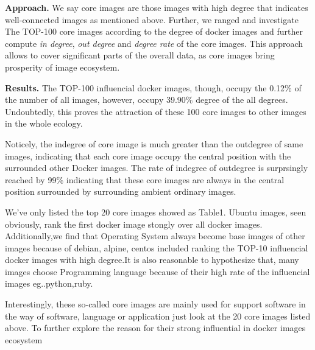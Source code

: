 \documentclass[sigconf]{acmart}
\begin{document}
\noindent\textbf{Approach. }We say core images are those images with high degree that indicates well-connected images as mentioned above. Further, we ranged and investigate The TOP-100 core images according to the degree of docker images and further compute \emph{in degree}, \emph{out degree} and \emph{degree rate} of the core images. This approach allows to cover significant parts of the overall data, as core images bring prosperity of image ecosystem.  %

\noindent\textbf{Results. }
The TOP-100 influencial docker images, though, occupy the 0.12\% of the number of all images, however, occupy 39.90\% degree of the all degrees. Undoubtedly, this proves the attraction of these 100 core images to other images in the whole ecology. 

Noticely, the indegree of core image is much greater than the outdegree of same images, indicating that each core image occupy the central position with the surrounded other Docker images. The rate of indegree of outdegree is surprsingly reached by 99\% indicating that these core images are always in the central position surrounded by surrounding ambient ordinary images. 


We've only listed the top 20 core images showed as Table1.
Ubuntu images, seen obviously, rank the first docker image stongly over all docker images. Additionally,we find that Operating System always become base images of other images because of debian, alpine, centos included ranking the TOP-10 influencial docker images with high degree.It is also reasonable to hypothesize that, many images choose  Programming language because of their high rate of the influencial images eg..python,ruby. 


Interestingly, these so-called core images are mainly used for support software in the way of software, language or application just look at the 20 core images listed above. 
To further explore the reason for their strong influential in docker images ecosystem
\end{document}
